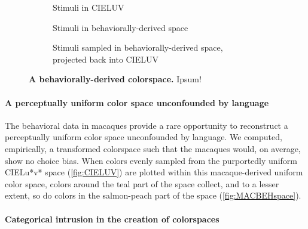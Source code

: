 \begin{figure}
    \centering
    \begin{subfigure}[b]{0.3\textwidth}
         \centering
         \caption{Stimuli in CIELUV \newline\newline}
         
         \label{fig:CIELUV}
    \end{subfigure}
    \hfill
    \begin{subfigure}[b]{0.3\textwidth}
         \centering
         \caption{Stimuli in behaviorally-derived space \newline}
         
         \label{fig:MACBEHspace}
    \end{subfigure}
    \hfill
    \begin{subfigure}[b]{0.3\textwidth}
         \centering
         \caption{Stimuli sampled in behaviorally-derived space, projected back into CIELUV}
         
         \label{fig:UniformStimsInCIELUV}
    \end{subfigure}
           \caption{\textbf{A behaviorally-derived colorspace.} Ipsum!}
        \label{fig:MACBEHcolorspace}
    
\end{figure}


\paragraph{A perceptually uniform color space unconfounded by language}

The behavioral data in macaques provide a rare opportunity to reconstruct a perceptually uniform color space unconfounded by language. 
We computed, empirically, a transformed colorspace such that the macaques would, on average, show no choice bias.
When colors evenly sampled from the purportedly uniform CIELu*v* space (\autoref{fig:CIELUV}) are plotted within this macaque-derived uniform color space, colors around the teal part of the space collect, and to a lesser extent, so do colors in the salmon-peach part of the space (\autoref{fig:MACBEHspace}). 

\paragraph{Categorical intrusion in the creation of colorspaces}

